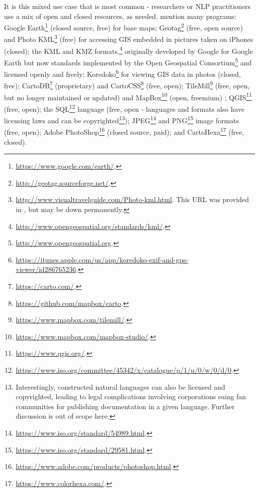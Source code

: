 It is this mixed use case that is most common - researchers or NLP practitioners use a mix of open and closed resources, as needed. \citet{gawne2016mapmaking} mention many programs: Google Earth\footnote{\href{https://www.google.com/earth/}{https://www.google.com/earth/}. } (closed source, free) for base maps; Geotag\footnote{\href{http://geotag.sourceforge.net/}{http://geotag.sourceforge.net/}. } (free, open source) and Photo KML\footnote{\href{http://www.visualtravelguide.com/Photo-kml.html}{http://www.visualtravelguide.com/Photo-kml.html}. This URL was provided in \citet{gawne2016mapmaking}, but may be down permanently.} (free) for accessing GIS embedded in pictures taken on iPhones (closed); the KML and KMZ formats,\footnote{\href{http://www.opengeospatial.org/standards/kml/}{http://www.opengeospatial.org/standards/kml/}. } originally developed by Google for Google Earth but now standards implemented by the Open Geospatial Consortium\footnote{\href{http://www.opengeospatial.org}{http://www.opengeospatial.org}. } and licensed openly and freely; Koredoko\footnote{\href{https://itunes.apple.com/us/app/koredoko-exif-and-gps-viewer/id286765236}{https://itunes.apple.com/us/app/koredoko-exif-and-gps-viewer/id286765236}. } for viewing GIS data in photos (closed, free); CartoDB\footnote{\href{https://carto.com/}{https://carto.com/}. } (proprietary) and CartoCSS\footnote{\href{https://github.com/mapbox/carto}{https://github.com/mapbox/carto}. } (free, open); TileMill\footnote{\href{https://www.mapbox.com/tilemill/}{https://www.mapbox.com/tilemill/}. } (free, open, but no longer maintained or updated) and MapBox\footnote{\href{https://www.mapbox.com/mapbox-studio/}{https://www.mapbox.com/mapbox-studio/}. } (open, freemium) ; QGIS\footnote{\href{https://www.qgis.org/}{https://www.qgis.org/}. } (free, open); the SQL\footnote{\href{https://www.iso.org/committee/45342/x/catalogue/p/1/u/0/w/0/d/0}{https://www.iso.org/committee/45342/x/catalogue/p/1/u/0/w/0/d/0}. } language (free, open - languages and formats also have licensing laws and can be copyrighted\footnote{Interestingly, constructed natural languages can also be licensed and copyrighted, leading to legal complications involving corporations suing fan communities for publishing documentation in a given language. Further discussion is out of scope here.}); JPEG\footnote{\href{https://www.iso.org/standard/54989.html}{https://www.iso.org/standard/54989.html}. } and PNG\footnote{\href{https://www.iso.org/standard/29581.html}{https://www.iso.org/standard/29581.html}. } image formats (free, open); Adobe PhotoShop\footnote{\href{https://www.adobe.com/products/photoshop.html}{https://www.adobe.com/products/photoshop.html}. } (closed source, paid); and CartoHexa\footnote{\href{https://www.colorhexa.com/}{https://www.colorhexa.com/}. } (free, closed).

